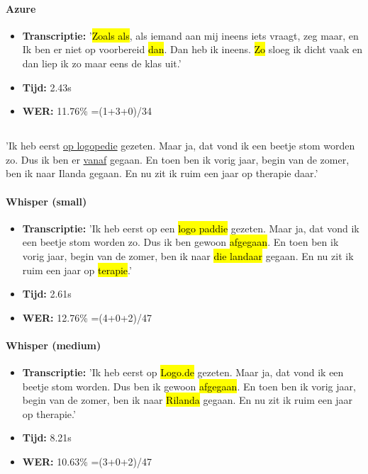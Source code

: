 \paragraph{Azure}
\begin{itemize}
\item \textbf{Transcriptie:} '\hl{Zoals als}, als iemand aan mij ineens iets vraagt, zeg maar, en Ik ben er niet op voorbereid \hl{dan}. Dan heb ik ineens. \hl{Zo} sloeg ik dicht vaak en dan liep ik zo maar eens de klas uit.'
\item \textbf{Tijd:} 2.43s
\item \textbf{WER:} 11.76\% =(1+3+0)/34
\end{itemize}

\subsection{}%
'Ik heb eerst \underline{op logopedie} gezeten. Maar ja, dat vond ik een beetje stom worden zo. Dus ik ben er \underline{vanaf} gegaan. En toen ben ik vorig jaar, begin van de zomer, ben ik naar Ilanda gegaan. En nu zit ik ruim een jaar op therapie daar.'

\paragraph{Whisper (small)}
\begin{itemize}
    \item \textbf{Transcriptie:} 'Ik heb eerst op een \hl{logo paddie} gezeten. Maar ja, dat vond ik een beetje stom worden zo. Dus ik ben\hl{ }gewoon\hl{ afgegaan}. En toen ben ik vorig jaar, begin van de zomer, ben ik naar \hl{die landaar} gegaan. En nu zit ik ruim een jaar op \hl{terapie}.'
    \item \textbf{Tijd:} 2.61s
    \item \textbf{WER:} 12.76\% =(4+0+2)/47
\end{itemize}

\paragraph{Whisper (medium)}
\begin{itemize}
    \item \textbf{Transcriptie:} 'Ik heb eerst op \hl{Logo.de} gezeten. Maar ja, dat vond ik een beetje stom worden. Dus ben ik\hl{ }gewoon\hl{ afgegaan}. En toen ben ik vorig jaar, begin van de zomer, ben ik naar \hl{Rilanda} gegaan. En nu zit ik ruim een jaar op therapie.'
    \item \textbf{Tijd:} 8.21s
    \item \textbf{WER:} 10.63\% =(3+0+2)/47
\end{itemize}

